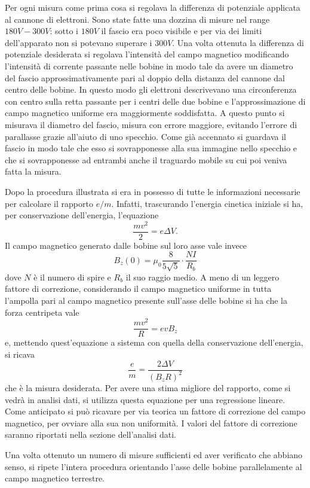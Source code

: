 \documentclass[a4paper,11pt]{article}
\begin{document}
	Per ogni misura come prima cosa si regolava la differenza di potenziale applicata al cannone di elettroni. Sono state fatte una dozzina di misure nel range $180 V - 300 V$: sotto i $180 V$ il fascio era poco visibile e per via dei limiti dell'apparato non si potevano superare i $300 V$. Una volta ottenuta la differenza di potenziale desiderata si regolava l'intensità del campo magnetico modificando l'intensità di corrente passante nelle bobine in modo tale da avere un diametro del fascio approssimativamente pari al doppio della distanza del cannone dal centro delle bobine. In questo modo gli elettroni descrivevano una circonferenza con centro sulla retta passante per i centri delle due bobine e l'approssimazione di campo magnetico uniforme era maggiormente soddisfatta. A questo punto si misurava il diametro del fascio, misura con errore maggiore, evitando l'errore di parallasse grazie all'aiuto di uno specchio. Come già accennato si guardava il fascio in modo tale che esso si sovrapponesse alla sua immagine nello specchio e che si sovrapponesse ad entrambi anche il traguardo mobile su cui poi veniva fatta la misura.
	
	Dopo la procedura illustrata si era in possesso di tutte le informazioni necessarie per calcolare il rapporto $e / m $. Infatti, trascurando l'energia cinetica iniziale si ha, per conservazione dell'energia, l'equazione $$ \frac{mv^2}{2} = e \Delta V.$$ Il campo magnetico generato dalle bobine sul loro asse vale invece $$ B _z (0) = \mu _0 \frac{8}{5 \sqrt{5}} \cdot \frac{NI}{R_b}$$ dove $N$ è il numero di spire e $R_b$ il suo raggio medio. A meno di un leggero fattore di correzione, considerando il campo magnetico uniforme in tutta l'ampolla pari al campo magnetico presente sull'asse delle bobine si ha che la forza centripeta vale $$\frac{m v^2}{R} = evB_z$$ e, mettendo quest'equazione a sistema con quella della conservazione dell'energia, si ricava $$\frac{e}{m} = \frac{2 \Delta V}{(B _z R)^2}$$ che è la misura desiderata. Per avere una stima migliore del rapporto, come si vedrà in analisi dati, si utilizza questa equazione per una regressione lineare. Come anticipato si può ricavare per via teorica un fattore di correzione del campo magnetico, per ovviare alla sua non uniformità. I valori del fattore di correzione saranno riportati nella sezione dell'analisi dati.
	
	Una volta ottenuto un numero di misure sufficienti ed aver verificato che abbiano senso, si ripete l'intera procedura orientando l'asse delle bobine parallelamente al campo magnetico terrestre.
	
\end{document}
